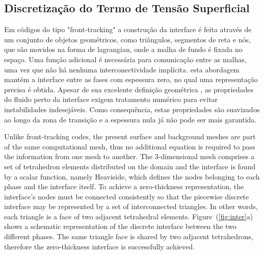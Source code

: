 \documentclass[a4paper,portuges]{article}
\begin{document}
\subsection{Discretização do Termo de Tensão Superficial}

Em códigos do tipo "front-tracking" a construção da interface é feita
através de um conjunto de objetos geométricos, como triângulos,
segmentos de reta e nós, que são movidos na forma de lagrangian, onde a
malha de fundo é fixada no espaço. Uma função adicional é necessária
para comunicação entre as malhas, uma vez que não há nenhuma
interconectividade implícita. esta abordagem mantém a interface entre as
fases com espessura zero, no qual uma representação precisa é obtida.
Apesar de sua excelente definição geométrica , as propriedades do fluido
perto da interface exigem tratamento numérico para evitar instabilidades
indesejáveis. Como consequência, estas propriedades são suavizados ao
longo da zona de transição e a espessura nula já não pode ser mais
garantida.




Unlike front-tracking codes, the present surface and background meshes
are part of the same computational mesh, thus no additional equation is
required to pass the information from one mesh to another. The
3-dimensional mesh comprises a set of tetrahedron elements distributed
on the domain and the interface is found by a scalar function, namely
Heaviside, which defines the nodes belonging to each phase and the
interface itself. To achieve a zero-thickness representation, the
interface's nodes must be connected consistently so that the piecewise
discrete interface may be represented by a set of interconnected
triangles. In other words, each triangle is a face of two adjacent
tetrahedral elements. Figure~(\ref{fig:inter}a) shows a schematic
representation of the discrete interface between the two different
phases. The same triangle face is shared by two adjacent tetrahedrons,
therefore the zero-thickness interface is successfully achieved.
\end{document}
